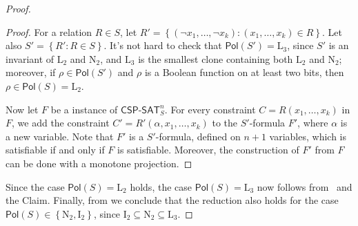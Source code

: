 \documentclass[10pt,a4paper]{article}
\def\sseq{\subseteq}
\newcommand{\set}[1]{\left\{#1\right\}}
\newcommand{\CSPf}[1]{\mathsf{CSP}\text{-}\mathsf{SAT}_{#1}}
\newcommand{\CSPfn}[2]{\CSPf{#1}^{#2}}
\newcommand{\Pol}{\mathsf{Pol}}
\newcommand{\clonefont}[1]{\mathrm{#1}}
\begin{document}
\begin{proof}
\begin{proof}
        For a relation $R \in S$,
        let $R' = \set{(\neg x_1,\dots, \neg x_k) : (x_1,\dots,x_k) \in R}$.
        Let also $S' = \set{R' : R \in S}$.
        It's not hard to check that 
        $\Pol(S') = \clonefont{L_3}$,
        since $S'$ is 
        an invariant of
        $\clonefont{L_2}$ and $\clonefont{N_2}$,
        and $\clonefont{L_3}$
        is the smallest clone containing both $\clonefont{L_2}$ and $\clonefont{N_2}$;
        moreover, if $\rho \in \Pol(S')$ and $\rho$ is a Boolean function on at
        least two bits, then
        $\rho \in \Pol(S) = \clonefont{L_2}$.

        Now let 
        $F$
        be a instance of $\CSPfn{S}{n}$.
        For every constraint $C = R(x_1,\dots,x_k)$ in $F$,
        we
        add the constraint
        $C' = R'(\alpha,x_1,\dots,x_k)$ to the $S'$-formula $F'$,
        where $\alpha$ is a new variable.
        Note that $F'$ is a $S'$-formula, defined on $n+1$ variables,
        which
        is satisfiable 
        if and only if $F$ is satisfiable.
        Moreover, the construction of $F'$ from $F$ can be done with a monotone
        projection.
    \end{proof}

    Since the case $\Pol(S) = \clonefont{L_2}$ holds,
    the case $\Pol(S) = \clonefont{L_3}$ now follows
    from~ and the Claim.
    Finally, from 
    we conclude that the 
    reduction
    also holds for the case
    $\Pol(S) \in \set{\clonefont{N_2},\clonefont{I_2}}$, since
    $\clonefont{I_2} \sseq \clonefont{N_2} \sseq \clonefont{L_3}$.
\end{proof}
\end{document}
